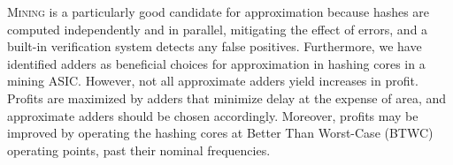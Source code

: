 \documentclass[portrait,a0,final]{a0poster}
\begin{document}
\begin{multicols}{3}
\begin{tcolorbox}[title=Conclusions]
\lettrine{M}{ining} is a particularly good candidate for approximation because hashes are computed independently and in parallel, mitigating the effect of errors, and a built-in verification system detects any false positives. Furthermore, we have identified adders as beneficial choices for approximation in hashing cores in a mining ASIC. However, not all approximate adders yield increases in profit. Profits are maximized by adders that minimize delay at the expense of area, and approximate adders should be chosen accordingly. Moreover, profits may be improved by operating the hashing cores at Better Than Worst-Case (BTWC) operating points, past their nominal frequencies.
\end{tcolorbox}

\end{multicols}

\end{document}
